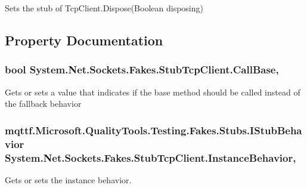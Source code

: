 Sets the stub of Tcp\-Client.\-Dispose(\-Boolean disposing)



\subsection{Property Documentation}
\hypertarget{class_system_1_1_net_1_1_sockets_1_1_fakes_1_1_stub_tcp_client_ad0bd61f1c79ff14fe6e9683ab0fb75fb}{
\subsubsection[{Call\-Base}]{\setlength{\rightskip}{0pt plus 5cm}bool System.\-Net.\-Sockets.\-Fakes.\-Stub\-Tcp\-Client.\-Call\-Base\hspace{0.3cm}{\ttfamily [get]}, {\ttfamily [set]}}}\label{class_system_1_1_net_1_1_sockets_1_1_fakes_1_1_stub_tcp_client_ad0bd61f1c79ff14fe6e9683ab0fb75fb}


Gets or sets a value that indicates if the base method should be called instead of the fallback behavior

\hypertarget{class_system_1_1_net_1_1_sockets_1_1_fakes_1_1_stub_tcp_client_a2e4798202c57593f8211d8d68981b7fd}{
\subsubsection[{Instance\-Behavior}]{\setlength{\rightskip}{0pt plus 5cm}mqttf.\-Microsoft.\-Quality\-Tools.\-Testing.\-Fakes.\-Stubs.\-I\-Stub\-Behavior System.\-Net.\-Sockets.\-Fakes.\-Stub\-Tcp\-Client.\-Instance\-Behavior\hspace{0.3cm}{\ttfamily [get]}, {\ttfamily [set]}}}\label{class_system_1_1_net_1_1_sockets_1_1_fakes_1_1_stub_tcp_client_a2e4798202c57593f8211d8d68981b7fd}


Gets or sets the instance behavior.

